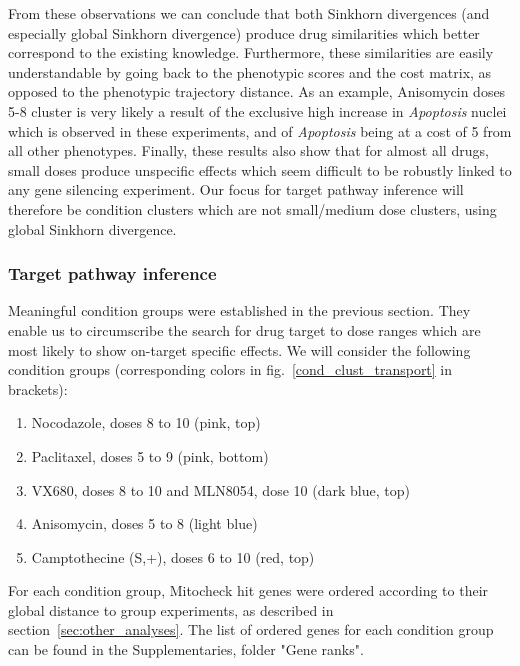 From these observations we can conclude that both Sinkhorn divergences (and especially global Sinkhorn divergence) produce drug similarities which better correspond to the existing knowledge. Furthermore, these similarities are easily understandable by going back to the phenotypic scores and the cost matrix, as opposed to the phenotypic trajectory distance. As an example, Anisomycin doses 5-8 cluster is very likely a result of the exclusive high increase in \textit{Apoptosis} nuclei which is observed in these experiments, and of \textit{Apoptosis} being at a cost of 5 from all other phenotypes. Finally, these results also show that for almost all drugs, small doses produce unspecific effects which seem difficult to be robustly linked to any gene silencing experiment. Our focus for target pathway inference will therefore be condition clusters which are not small/medium dose clusters, using global Sinkhorn divergence.

\subsubsection{Target pathway inference}
Meaningful condition groups were established in the previous
section. They enable us to circumscribe the search for drug target to
dose ranges which are most likely to show on-target specific
effects. We will consider the following condition groups
(corresponding colors in fig.~\ref{cond_clust_transport} in brackets):  
\begin{enumerate}
\item Nocodazole, doses 8 to 10 (pink, top)
\item Paclitaxel, doses 5 to 9 (pink, bottom)
\item VX680, doses 8 to 10 and MLN8054, dose 10 (dark blue, top)
\item Anisomycin, doses 5 to 8 (light blue)
\item Camptothecine (S,+), doses 6 to 10 (red, top)
\end{enumerate}

For each condition group, Mitocheck hit genes were ordered according to their global distance to group experiments, as described in section~\ref{sec:other_analyses}. The list of ordered genes for each condition group can be found in the Supplementaries, folder "Gene ranks".

